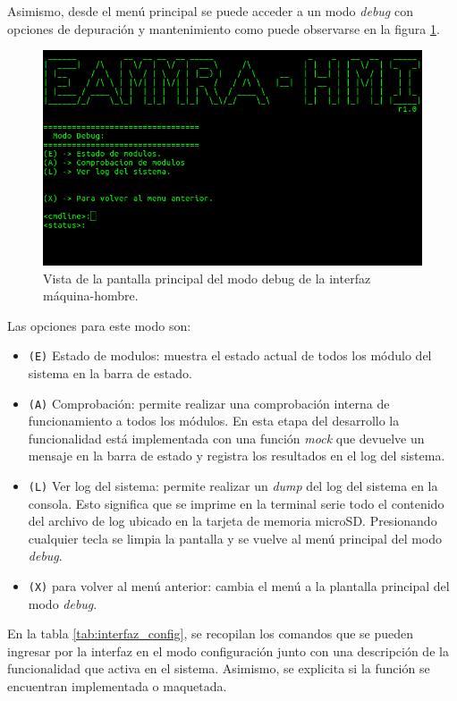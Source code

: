 Asimismo, desde el menú principal se puede acceder a un modo \textit{debug} con opciones de depuración y mantenimiento como puede observarse en la figura \ref{fig:interfaz_debug}.  

\begin{figure}[htpb]
	\centering
	\includegraphics[width=\textwidth]{./Figures/interfaz_debug.png}
	\caption{Vista de la pantalla principal del modo debug de la interfaz máquina-hombre.}
	\label{fig:interfaz_debug}
\end{figure}

Las opciones para este modo son:

\begin{itemize}
  \item \texttt{(E)} Estado de modulos: muestra el estado actual de todos los módulo del sistema en la barra de estado.
  \item \texttt{(A)} Comprobación: permite realizar una comprobación interna de funcionamiento a todos los módulos. En esta etapa del desarrollo la funcionalidad está implementada con una función \textit{mock} que devuelve un mensaje en la barra de estado y registra los resultados en el log del sistema.
  \item \texttt{(L)} Ver log del sistema: permite realizar un \textit{dump} del log del sistema en la consola.  Esto significa que se imprime en la terminal serie todo el contenido del archivo de log ubicado en la tarjeta de memoria microSD. Presionando cualquier tecla se limpia la pantalla y se vuelve al menú principal del modo \textit{debug}.
  \item \texttt{(X)} para volver al menú anterior: cambia el menú a la plantalla principal del modo \textit{debug}.
\end{itemize}

En la tabla \ref{tab:interfaz_config}, se recopilan los comandos que se pueden ingresar por la interfaz en el modo configuración junto con una descripción de la funcionalidad que activa en el sistema.  Asimismo, se explicita si la función se encuentran implementada o maquetada. 

